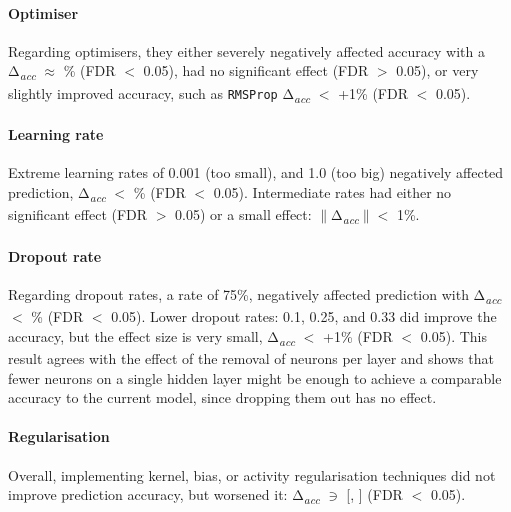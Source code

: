 {\paragraph{Optimiser}

Regarding optimisers, they either severely negatively affected accuracy with a Δ\textsubscript{\textit{acc}} $\approx$ \% (FDR $<$ 0.05), had no significant effect (FDR $>$ 0.05), or very slightly improved accuracy, such as \texttt{RMSProp} Δ\textsubscript{\textit{acc}} $<$ +1\% (FDR $<$ 0.05).

\paragraph{Learning rate}

Extreme learning rates of 0.001 (too small), and 1.0 (too big) negatively affected prediction, Δ\textsubscript{\textit{acc}} $<$ \% (FDR $<$ 0.05). Intermediate rates had either no significant effect (FDR $>$ 0.05) or a small effect: $\|$Δ\textsubscript{\textit{acc}}$\| <$ 1\%.

\paragraph{Dropout rate}

Regarding dropout rates, a rate of 75\%, negatively affected prediction with Δ\textsubscript{\textit{acc}} $<$ \% (FDR $<$ 0.05). Lower dropout rates: 0.1, 0.25, and 0.33 did improve the accuracy, but the effect size is very small, Δ\textsubscript{\textit{acc}} $<$ +1\% (FDR $<$ 0.05). This result agrees with the effect of the removal of neurons per layer and shows that fewer neurons on a single hidden layer might be enough to achieve a comparable accuracy to the current model, since dropping them out has no effect.

\paragraph{Regularisation}

Overall, implementing kernel, bias, or activity regularisation techniques did not improve prediction accuracy, but worsened it: Δ\textsubscript{\textit{acc}} $\ni$ [, ] (FDR $<$ 0.05).

\vspace{+19pt} %

}
